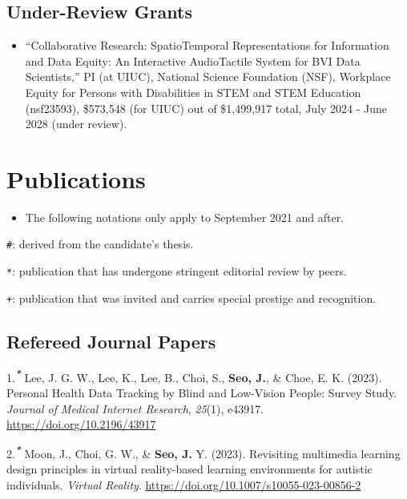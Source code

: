 \documentclass[11pt,a4paper,]{awesome-cv}
\providecommand{\tightlist}{%
	\setlength{\itemsep}{0pt}\setlength{\parskip}{0pt}}
\begin{document}
\hypertarget{under-review-grants}{%
\subsection{Under-Review Grants}\label{under-review-grants}}

\begin{itemize}
\tightlist
\item
  ``Collaborative Research: SpatioTemporal Representations for
  Information and Data Equity: An Interactive AudioTactile System for
  BVI Data Scientists,'' PI (at UIUC), National Science Foundation
  (NSF), Workplace Equity for Persons with Disabilities in STEM and STEM
  Education (nsf23593), \$573,548 (for UIUC) out of \$1,499,917 total,
  July 2024 - June 2028 (under review).
\end{itemize}

\hypertarget{publications}{%
\section{Publications}\label{publications}}

\begin{itemize}
\tightlist
\item
  The following notations only apply to September 2021 and after.
\end{itemize}

\texttt{\#}: derived from the candidate's thesis.

\texttt{*}: publication that has undergone stringent editorial review by
peers.

\texttt{+}: publication that was invited and carries special prestige
and recognition.

\hypertarget{refereed-journal-papers}{%
\subsection{Refereed Journal Papers}\label{refereed-journal-papers}}

\hypertarget{bibliography}{}
\leavevmode\hypertarget{ref-leePersonalHealthData2023}{}%
1.\textsuperscript{\emph{\textbf{*}}} Lee, J. G. W., Lee, K., Lee, B.,
Choi, S., \textbf{Seo, J.}, \& Choe, E. K. (2023). Personal Health Data
Tracking by Blind and Low-Vision People: Survey Study. \emph{Journal of
Medical Internet Research}, \emph{25}(1), e43917.
\url{https://doi.org/10.2196/43917}

\leavevmode\hypertarget{ref-moonRevisitingMultimediaLearning2023}{}%
2.\textsuperscript{\emph{\textbf{*}}} Moon, J., Choi, G. W., \&
\textbf{Seo, J.} Y. (2023). Revisiting multimedia learning design
principles in virtual reality-based learning environments for autistic
individuals. \emph{Virtual Reality}.
\url{https://doi.org/10.1007/s10055-023-00856-2}
\end{document}
